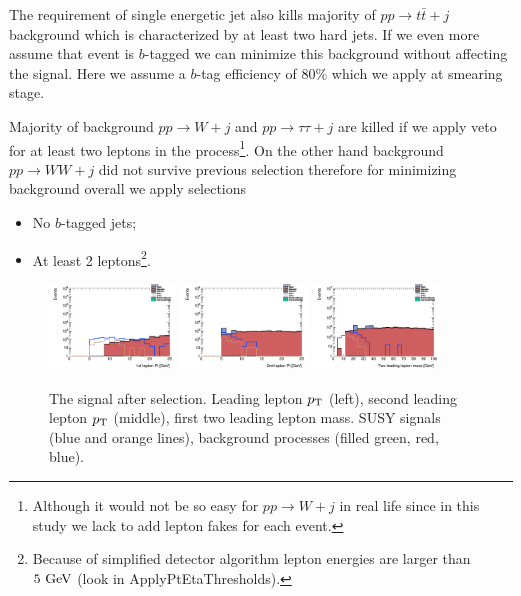 \documentclass[tightenline,notitlepage,nofootinbib]{revtex4-1}
\begin{document}
The requirement of single energetic jet also kills majority of $pp \to t \bar t + j$ background which is characterized by at least two hard jets. If we even more assume that event is $b$-tagged we can minimize this background without affecting the signal. Here we assume a $b$-tag efficiency of $80 \%$ which we apply at smearing stage.

Majority of background $pp \to W + j$ and $pp \to \tau \tau +j$ are killed if we apply veto for at least two leptons in the process\footnote{Although it would not be so easy for $pp \to W +j$ in real life since in this study we lack to add lepton fakes for each event.}. On the other hand background $pp \to WW + j$ did not survive previous selection therefore for minimizing background overall we apply selections
\begin{itemize}
\item No $b$-tagged jets;
\item At least 2 leptons\footnote{Because of simplified detector algorithm lepton energies are larger than $5~\rm{GeV}$ (look in ApplyPtEtaThresholds).}.
\end{itemize}
\begin{figure}[!ht]
  \centering
  \includegraphics[width=0.3\textwidth]{h_PtMuons1st_2lead.png}
  \includegraphics[width=0.3\textwidth]{h_PtMuons2nd_2lead.png}
  \includegraphics[width=0.3\textwidth]{h_llmass_2lead.png}
  \caption{The signal after selection. Leading lepton $p_{\rm T}$ (left), second leading lepton $p_{\rm T}$ (middle), first two leading lepton mass. SUSY signals (blue and orange lines), background processes (filled green, red, blue).}
  \label{fig:select}
\end{figure}
\end{document}

